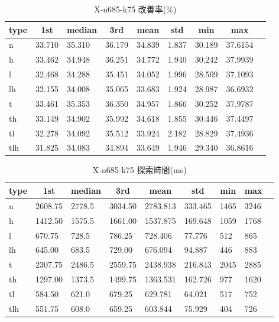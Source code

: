\begin{table}[htbp]
    \caption{X-n685-k75 改善率(\%)}
    \begin{tabular}{|l|l|l|l|l|l|l|l|l|}\hline
    \multicolumn{1}{|c|}{\textbf{type}}
    &\multicolumn{1}{|c|}{\textbf{1st}}
    &\multicolumn{1}{c|}{\textbf{median}}
    &\multicolumn{1}{c|}{\textbf{3rd}}
    &\multicolumn{1}{c|}{\textbf{mean}}
    &\multicolumn{1}{c|}{\textbf{std}}
    &\multicolumn{1}{c|}{\textbf{min}}
    &\multicolumn{1}{c|}{\textbf{max}}\\\hline
	n & 33.710 & 35.310 & 36.179 & 34.839 & 1.837 & 30.189 & 37.6154\\\hline
	h & 33.462 & 34.948 & 36.251 & 34.772 & 1.940 & 30.242 & 37.9939\\\hline
	l & 32.468 & 34.288 & 35.451 & 34.052 & 1.996 & 28.509 & 37.1093\\\hline
	lh & 32.155 & 34.008 & 35.065 & 33.683 & 1.924 & 28.987 & 36.6932\\\hline
	t & 33.461 & 35.353 & 36.350 & 34.957 & 1.866 & 30.252 & 37.9787\\\hline
	th & 33.149 & 34.902 & 35.992 & 34.618 & 1.855 & 30.446 & 37.4497\\\hline
	tl & 32.278 & 34.092 & 35.512 & 33.924 & 2.182 & 28.829 & 37.4936\\\hline
	tlh & 31.825 & 34.083 & 34.894 & 33.649 & 1.946 & 29.340 & 36.8616\\\hline
	\end{tabular}
\end{table}
\begin{table}[htbp]
    \caption{X-n685-k75 探索時間(ms)}
    \begin{tabular}{|l|l|l|l|l|l|l|l|l|}\hline
    \multicolumn{1}{|c|}{\textbf{type}}
    &\multicolumn{1}{|c|}{\textbf{1st}}
    &\multicolumn{1}{c|}{\textbf{median}}
    &\multicolumn{1}{c|}{\textbf{3rd}}
    &\multicolumn{1}{c|}{\textbf{mean}}
    &\multicolumn{1}{c|}{\textbf{std}}
    &\multicolumn{1}{c|}{\textbf{min}}
    &\multicolumn{1}{c|}{\textbf{max}}\\\hline
	n & 2608.75 & 2778.5 & 3034.50 & 2783.813 & 333.465 & 1465 & 3246\\\hline
	h & 1412.50 & 1575.5 & 1661.00 & 1537.875 & 169.648 & 1059 & 1768\\\hline
	l & 670.75 & 728.5 & 786.25 & 728.406 & 77.776 & 512 & 865\\\hline
	lh & 645.00 & 683.5 & 729.00 & 676.094 & 94.887 & 446 & 883\\\hline
	t & 2307.75 & 2486.5 & 2559.75 & 2438.938 & 216.843 & 2045 & 2885\\\hline
	th & 1297.00 & 1373.5 & 1499.75 & 1363.531 & 162.726 & 977 & 1620\\\hline
	tl & 584.50 & 621.0 & 679.25 & 629.781 & 64.021 & 517 & 752\\\hline
	tlh & 551.75 & 608.0 & 659.25 & 603.844 & 75.929 & 404 & 726\\\hline
	\end{tabular}
\end{table}
